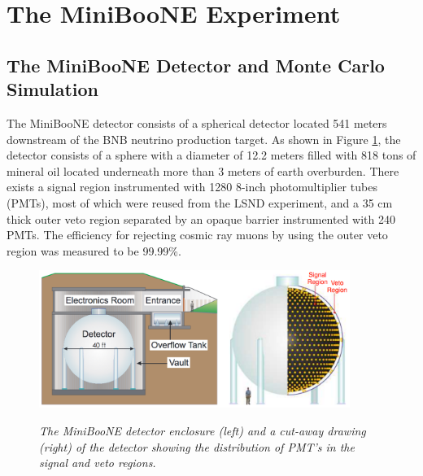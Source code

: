 \section{The MiniBooNE Experiment}

\subsection{The MiniBooNE Detector and Monte Carlo Simulation}



The MiniBooNE detector \cite{MBDetectorPaper} consists of a spherical detector located 541 meters downstream of the BNB neutrino production target. As shown in Figure \ref{MB_detector_fig}, the detector consists of a sphere with a diameter of 12.2 meters filled with 818 tons of mineral oil located underneath more than 3 meters of earth overburden. There exists a signal region instrumented with 1280 8-inch photomultiplier tubes (PMTs), most of which were reused from the LSND experiment, and a 35 cm thick outer veto region separated by an opaque barrier instrumented with 240 PMTs. The efficiency for rejecting cosmic ray muons by using the outer veto region was measured to be 99.99\%.\\
\begin{figure}[ht!]
\centering
	\includegraphics[width=0.9\textwidth]{Figures/MB_detectorpaper_fig.png} \\
\caption{\textit{The MiniBooNE detector enclosure (left) and a cut-away drawing (right) of the detector showing the distribution of PMT's in the signal and veto regions.}}\label{MB_detector_fig}
\end{figure}

